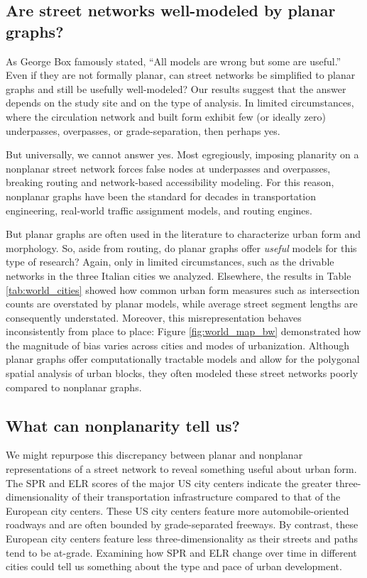 \documentclass[Afour,sageh,times]{sagej}
\begin{document}
\subsection{Are street networks well-modeled by planar graphs?}

As George Box famously stated, \enquote{All models are wrong but some are useful.} Even if they are not formally planar, can street networks be simplified to planar graphs and still be usefully well-modeled? Our results suggest that the answer depends on the study site and on the type of analysis. In limited circumstances, where the circulation network and built form exhibit few (or ideally zero) underpasses, overpasses, or grade-separation, then perhaps yes.

But universally, we cannot answer yes. Most egregiously, imposing planarity on a nonplanar street network forces false nodes at underpasses and overpasses, breaking routing and network-based accessibility modeling. For this reason, nonplanar graphs have been the standard for decades in transportation engineering, real-world traffic assignment models, and routing engines.

But planar graphs are often used in the literature to characterize urban form and morphology. So, aside from routing, do planar graphs offer \emph{useful} models for this type of research? Again, only in limited circumstances, such as the drivable networks in the three Italian cities we analyzed. Elsewhere, the results in Table \ref{tab:world_cities} showed how common urban form measures such as intersection counts are overstated by planar models, while average street segment lengths are consequently understated. Moreover, this misrepresentation behaves inconsistently from place to place: Figure \ref{fig:world_map_bw} demonstrated how the magnitude of bias varies across cities and modes of urbanization. Although planar graphs offer computationally tractable models and allow for the polygonal spatial analysis of urban blocks, they often modeled these street networks poorly compared to nonplanar graphs.


\subsection{What can nonplanarity tell us?}

We might repurpose this discrepancy between planar and nonplanar representations of a street network to reveal something useful about urban form. The SPR and ELR scores of the major US city centers indicate the greater three-dimensionality of their transportation infrastructure compared to that of the European city centers. These US city centers feature more automobile-oriented roadways and are often bounded by grade-separated freeways. By contrast, these European city centers feature less three-dimensionality as their streets and paths tend to be at-grade. Examining how SPR and ELR change over time in different cities could tell us something about the type and pace of urban development. 
\end{document}
